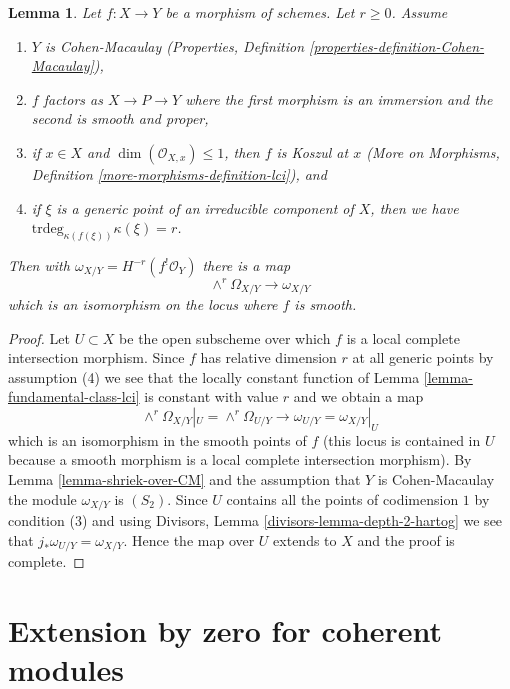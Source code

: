 \documentclass{stacks-project}
\theoremstyle{plain}
\newtheorem{lemma}[subsection]{Lemma}
\theoremstyle{definition}
\theoremstyle{remark}
\numberwithin{equation}{subsection}
\begin{document}
\begin{lemma}
\label{lemma-fundamental-class-almost-lci}
Let $f : X \to Y$ be a morphism of schemes. Let $r \geq 0$. Assume
\begin{enumerate}
\item $Y$ is Cohen-Macaulay (Properties, Definition
\ref{properties-definition-Cohen-Macaulay}),
\item $f$ factors as $X \to P \to Y$ where the first morphism is
an immersion and the second is smooth and proper,
\item if $x \in X$ and $\dim(\mathcal{O}_{X, x}) \leq 1$,
then $f$ is Koszul at $x$ (More on Morphisms, Definition
\ref{more-morphisms-definition-lci}), and
\item if $\xi$ is a generic point of an irreducible component of $X$, then
we have
$\text{trdeg}_{\kappa(f(\xi))} \kappa(\xi) = r$.
\end{enumerate}
Then with $\omega_{X/Y} = H^{-r}(f^!\mathcal{O}_Y)$ there is a map
$$
\wedge^r\Omega_{X/Y} \longrightarrow \omega_{X/Y}
$$
which is an isomorphism on the locus where $f$ is smooth.
\end{lemma}

\begin{proof}
Let $U \subset X$ be the open subscheme over which $f$ is a
local complete intersection morphism. Since $f$ has relative
dimension $r$ at all generic points by assumption (4) we
see that the locally constant function of
Lemma \ref{lemma-fundamental-class-lci}
is constant with value $r$ and we obtain a map
$$
\wedge^r\Omega_{X/Y}|_U = \wedge^r \Omega_{U/Y}
\longrightarrow
\omega_{U/Y} = \omega_{X/Y}|_U
$$
which is an isomorphism in the smooth points of $f$ (this locus
is contained in $U$ because a smooth morphism is a local complete
intersection morphism). By Lemma \ref{lemma-shriek-over-CM}
and the assumption that $Y$ is Cohen-Macaulay
the module $\omega_{X/Y}$ is $(S_2)$.
Since $U$ contains all the points of codimension $1$ by condition (3)
and using Divisors, Lemma \ref{divisors-lemma-depth-2-hartog}
we see that $j_*\omega_{U/Y} = \omega_{X/Y}$.
Hence the map over $U$ extends to $X$ and the proof
is complete.
\end{proof}






\section{Extension by zero for coherent modules}
\label{section-extension-by-zero}
\end{document}
